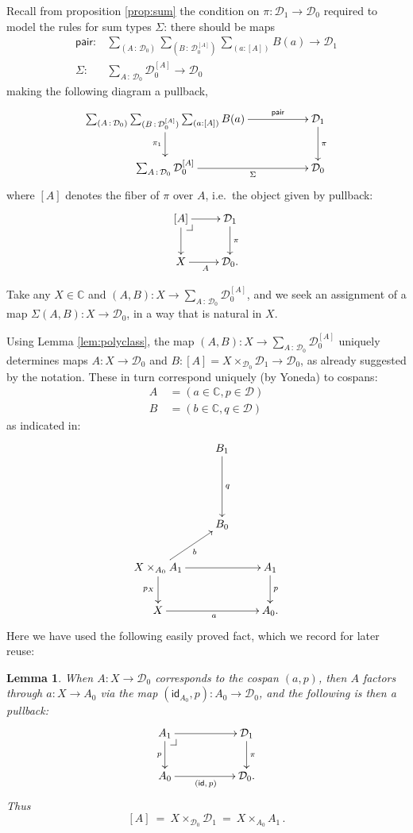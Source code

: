 \documentclass[12pt]{article}
\makeatletter
\newcommand{\cors}[1]{\ensuremath{[#1]}}
\newcommand{\C}{\ensuremath{\mathbb{C}}}
\newcommand{\D}{\ensuremath{\mathcal{D}}}
\newcommand{\pbcorner}[1][dr]{\save*!/#1-1.2pc/#1:(-1,1)@^{|-}\restore}
\newcommand{\identity}{\ensuremath{\mathsf{id}}}
\newcommand{\ty}{\ensuremath{\,:\,}}
\newcommand{\pairmap}{\ensuremath{\mathsf{pair}}}
\newtheorem{lemma}[theorem]{Lemma}
\theoremstyle{definition}
\makeatother
\begin{document}
Recall from proposition \ref{prop:sum} the condition on $\pi : \D_1 \to \D_0$ required to model the rules for sum types $\Sigma$:
there should be maps  
\begin{align*}%
\pairmap :& \sum_{(A\ty\D_0)}\sum_{(B\ty\D_0^{\cors{A}})}\sum_{(a : \cors{A})}B(a) \to \D_1\\
\Sigma :& \sum_{A\ty\D_0}\D_0^{\cors{A}} \to \D_0\label{eq:sumop2}
\end{align*}
making the following diagram a pullback,
%
\begin{equation}\label{diag:sigmapb}
\xymatrix{
 \sum_{(A\ty\D_0)}\sum_{(B\ty\D_0^{\cors{A}})}\sum_{(a : \cors{A})}B(a) \ar[d]_{\pi_1} \ar[rr]^-{\pairmap} &&  \D_1 \ar[d]^{\pi}\\
\sum_{A\ty\D_0}\D_0^{\cors{A}} \ar[rr]_-{\Sigma} && \D_0 }
\end{equation}
%
where $\cors{A}$ denotes the fiber of $\pi$ over $A$, i.e.\ the object given by pullback:
%
\begin{equation*}%
\xymatrix{
\cors{A} \ar[d] \ar[r] \pbcorner &  \D_1 \ar[d]^{\pi}\\
X \ar[r]_A & \D_0. }
\end{equation*}
%

Take any $X\in\C$ and $(A,B) : X \to \sum_{A\ty\D_0}\D_0^{\cors{A}}$, and we seek an assignment of a map $\Sigma(A,B) : X \to \D_0$, in a way that is natural in $X$.  

Using Lemma \ref{lem:polyclass}, the map $(A,B) : X \to \sum_{A\ty\D_0}\D_0^{\cors{A}}$ uniquely determines maps $A : X \to \D_0$ and $B : \cors{A} = X\times_{\D_0} \D_1 \to \D_0$, as already suggested by the notation. These in turn correspond uniquely (by Yoneda) to cospans:
\begin{align*}
A\ &= (a\in\C, p\in\D) \\
B\ &= (b\in\C, q\in\D)
\end{align*}
as indicated in:
%
\begin{equation}\label{diag:wrongsigma}
\xymatrix{
& B_1 \ar[dd]^{q} &\\
&& \\
& B_0 &\\
X\times_{A_0} A_1 \ar[ru]_-{b} \ar[d]_{p_X} \ar[rr] && A_1 \ar[d]^{p}\\
X \ar[rr]_{a} && A_0.}
\end{equation}
Here we have used the following easily proved fact, which we record for later reuse:

\begin{lemma}\label{lem:reindex}
When $A : X\to\D_0$ corresponds to the cospan $(a,p)$, then $A$ factors through $a : X \to A_0$ via the map $(\identity_{A_0}, p) : A_0\to\D_0$, and the following is then a pullback:
\[
\xymatrix{
A_1 \ar[d]_{p} \ar[rr] \pbcorner &&  \D_1 \ar[d]^{\pi}\\
A_0 \ar[rr]_{(\identity,\,p)} && \D_0 .}
\]
Thus
\[
\cors{A}\ =\ X\times_{\D_0} \D_1\ =\ X\times_{A_0} A_1\,.
\]
\end{lemma}
\end{document}
